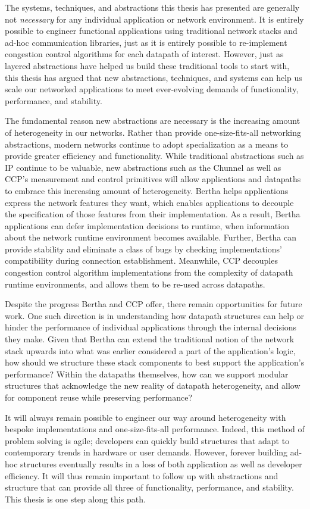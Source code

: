 The systems, techniques, and abstractions this thesis has presented are generally not \emph{necessary} for any individual application or network environment. It is entirely possible to engineer functional applications using traditional network stacks and ad-hoc communication libraries, just as it is entirely possible to re-implement congestion control algorithms for each datapath of interest. 
However, just as layered abstractions have helped us build these traditional tools to start with, this thesis has argued that new abstractions, techniques, and systems can help us scale our networked applications to meet ever-evolving demands of functionality, performance, and stability. 

The fundamental reason new abstractions are necessary is the increasing amount of heterogeneity in our networks. Rather than provide one-size-fits-all networking abstractions, modern networks continue to adopt specialization as a means to provide greater efficiency and functionality. 
While traditional abstractions such as IP continue to be valuable, new abstractions such as the Chunnel as well as CCP's measurement and control primitives will allow applications and datapaths to embrace this increasing amount of heterogeneity.
Bertha helps applications express the network features they want, which enables applications to decouple the specification of those features from their implementation. As a result, Bertha applications can defer implementation decisions to runtime, when information about the network runtime environment becomes available. Further, Bertha can provide stability and eliminate a class of bugs by checking implementations' compatibility during connection establishment.
Meanwhile, CCP decouples congestion control algorithm implementations from the complexity of datapath runtime environments, and allows them to be re-used across datapaths. 

Despite the progress Bertha and CCP offer, there remain opportunities for future work. One such direction is in understanding how datapath structures can help or hinder the performance of individual applications through the internal decisions they make. 
Given that Bertha can extend the traditional notion of the network stack upwards into what was earlier considered a part of the application's logic, how should we structure these stack components to best support the application's performance?
Within the datapaths themselves, how can we support modular structures that acknowledge the new reality of datapath heterogeneity, and allow for component reuse while preserving performance?

It will always remain possible to engineer our way around heterogeneity with bespoke implementations and one-size-fits-all performance. Indeed, this method of problem solving is agile; developers can quickly build structures that adapt to contemporary trends in hardware or user demands. However, forever building ad-hoc structures eventually results in a loss of both application as well as developer efficiency. 
It will thus remain important to follow up with abstractions and structure that can provide all three of functionality, performance, and stability. This thesis is one step along this path.
